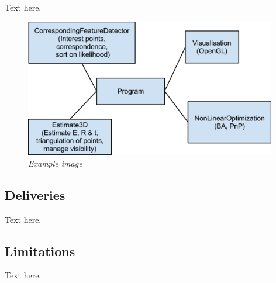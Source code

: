 Text here.

\begin{figure}[htb]
	\centering
	\includegraphics[width=110mm]{images/example2.png}
	\caption[This text ends up at the table of figures]{\textit{Example image}}
	\label{fig:block_overview2_fig}  %
\end{figure}

\subsection{Deliveries}
Text here.

\subsection{Limitations}
Text here.
